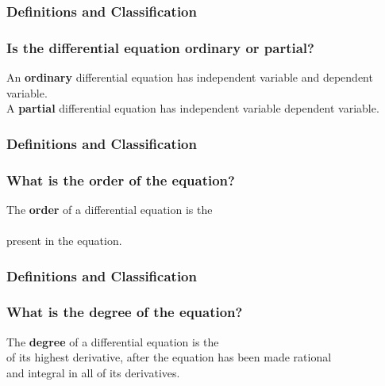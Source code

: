 \documentclass[fleqn]{beamer} %
\newcommand{\sectionIsubsectionItitle}{Definitions and Classification}
\begin{document}
			\begin{frame}
				\frametitle{\sectionIsubsectionItitle}
				\bigskip

				\frametitle{Is the differential equation ordinary or partial?}

				An {\bf ordinary} differential equation has \underline{\hspace{20mm}} independent \vspc variable and \underline{\hspace{20mm}} dependent variable. \vspace{10mm}\\

				A {\bf partial} differential equation has \underline{\hspace{50mm}} \vspc independent variable  \underline{\hspace{20mm}}  dependent variable. \vspace{10mm}\\

				\btVFill
			\end{frame}

			\begin{frame}
				\frametitle{\sectionIsubsectionItitle}
				\bigskip

  				\frametitle{What is the order of the equation?}
  
				The {\bf order} of a differential equation is the \vspace{3mm}\\ \underline{\hspace{50mm}}\hspace{3mm}\underline{\hspace{50mm}} \vspace{5mm}\\ present in the equation. \vspace{3mm}\\
	  
				\btVFill
			\end{frame}

							\begin{frame}
				\frametitle{\sectionIsubsectionItitle}
				\bigskip

  				\frametitle{What is the degree of the equation?}

				The {\bf degree} of a differential equation is the \underline{\hspace{30mm}}\hspace{3mm} \vspace{5mm}\\ of its highest derivative, after the equation has been made rational \vspace{5mm}\\ and integral in all of its derivatives. \vspace{3mm}\\

				\btVFill
			\end{frame}
\end{document}
